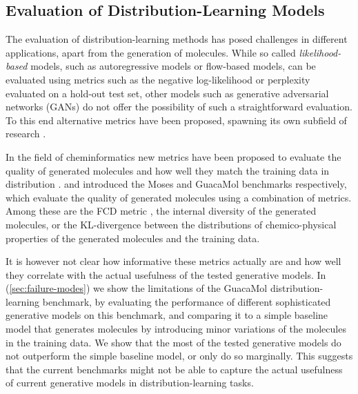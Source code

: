 \subsection{Evaluation of Distribution-Learning Models}
The evaluation of distribution-learning methods has posed challenges in
different applications, apart from the generation of molecules. While so called
\emph{likelihood-based} models, such as autoregressive models or flow-based
models, can be evaluated using metrics such as the negative log-likelihood or
perplexity evaluated on a hold-out test set, 
other models such as generative adversarial networks (GANs)
\citep{goodfellowGenerativeAdversarialNetworks2014} do not offer the possibility of
such a straightforward evaluation. To this end alternative metrics have been proposed, 
spawning its own subfield of research \citep{heuselGANsTrainedTwo2017}.

In the field of cheminformatics new metrics have been proposed to evaluate the
quality of generated molecules and how well they match the training data in
distribution \citep{preuerFrechetChemNetDistance2018}.
\citet{polykovskiyMolecularSetsMOSES2020} and
\citet{brownGuacaMolBenchmarkingModels2019} introduced the Moses and GuacaMol
benchmarks respectively, which evaluate the quality of generated molecules using
a combination of metrics. Among these are the FCD metric
\citep{preuerFrechetChemNetDistance2018}, the internal diversity
\citep{benhendaChemGANChallengeDrug2017} of the generated molecules, or the
KL-divergence between the distributions of chemico-physical properties of the
generated molecules and the training data.

It is however not clear how informative these metrics actually are and how well
they correlate with the actual usefulness of the tested generative models. In
\citep{renzFailureModesMolecule2019} (\cref{sec:failure-modes}) we show the
limitations of the GuacaMol distribution-learning benchmark, by evaluating the
performance of different sophisticated generative models on this benchmark, and
comparing it to a simple baseline model that generates molecules by introducing
minor variations of the molecules in the training data. We show that the 
most of the tested generative models do not outperform the simple baseline
model, or only do so marginally. This suggests that the current benchmarks
might not be able to capture the actual usefulness of current generative models 
in distribution-learning tasks.

